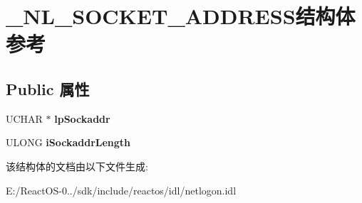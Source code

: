 \hypertarget{struct___n_l___s_o_c_k_e_t___a_d_d_r_e_s_s}{}\section{\+\_\+\+N\+L\+\_\+\+S\+O\+C\+K\+E\+T\+\_\+\+A\+D\+D\+R\+E\+S\+S结构体 参考}
\label{struct___n_l___s_o_c_k_e_t___a_d_d_r_e_s_s}
\subsection*{Public 属性}
\begin{DoxyCompactItemize}
\item 
\mbox{\label{struct___n_l___s_o_c_k_e_t___a_d_d_r_e_s_s_aa96ef3a89640a5521ffff3dc6a201bcc}} 
U\+C\+H\+AR $\ast$ {\bfseries lp\+Sockaddr}
\item 
\mbox{\label{struct___n_l___s_o_c_k_e_t___a_d_d_r_e_s_s_a94f2b970e6b1f74f93725f856551de41}} 
U\+L\+O\+NG {\bfseries i\+Sockaddr\+Length}
\end{DoxyCompactItemize}


该结构体的文档由以下文件生成\+:\begin{DoxyCompactItemize}
\item 
E\+:/\+React\+O\+S-\/0../sdk/include/reactos/idl/netlogon.\+idl\end{DoxyCompactItemize}
